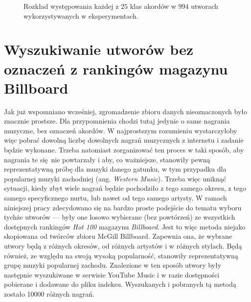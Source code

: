 \begin{figure}
    \centering
    \caption{Rozkład występowania każdej z $25$ klas akordów w $994$ utworach wykorzystywanych w eksperymentach.}
    \label{fig:chords_histogram}
\end{figure}


\section{Wyszukiwanie utworów bez oznaczeń z rankingów magazynu Billboard}

Jak już wspomniano wcześniej, zgromadzenie zbioru danych nieoznaczonych było znacznie prostsze. Dla przypomnienia chodzi tutaj jedynie o same nagrania muzyczne, bez oznaczeń akordów. W najprostszym rozumieniu wystarczyłoby więc pobrać dowolną liczbę dowolnych nagrań muzycznych z internetu i zadanie będzie wykonane. Trzeba natomiast zorganizować ten proces w taki sposób, aby nagrania te się nie powtarzały i aby, co ważniejsze, stanowiły pewną reprezentatywną próbę dla muzyki danego gatunku, w tym przypadku dla popularnej muzyki zachodniej (ang. \emph{Western Music}). Trzeba więc uniknąć sytuacji, kiedy zbyt wiele nagrań będzie pochodziło z tego samego okresu, z tego samego specyficznego nurtu, lub nawet od tego samego artysty. W ramach niniejszej pracy zdecydowano się na bardzo proste podejście do tematu wyboru tychże utworów --- były one losowo wybierane (bez powtórzeń) ze wszystkich dostępnych rankingów \emph{Hot 100} magazynu \emph{Billboard}. Jest to więc metoda niejako skopiowana od twórców zbioru McGill Billboard. Zapewnia ona, że wybrane utwory będą z różnych okresów, od różnych artystów i w różnych stylach. Będą również, ze względu na swoją wysoką popularność, stanowiły reprezentatywną grupę muzyki popularnej zachodu. Znalezione w ten sposób utwory były następnie wyszukiwane w serwisie YouTube Music i w razie dostępności pobierane i dodawane do pliku indeksu. Wyszukanych i pobranych tą metodą zostało 10000 różnych nagrań.

